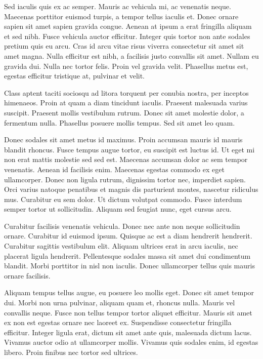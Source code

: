 Sed iaculis quis ex ac semper. Mauris ac vehicula mi, ac venenatis neque. Maecenas porttitor euismod turpis, a tempor tellus iaculis et. Donec ornare sapien sit amet sapien gravida congue. Aenean at ipsum a erat fringilla aliquam et sed nibh. Fusce vehicula auctor efficitur. Integer quis tortor non ante sodales pretium quis eu arcu. Cras id arcu vitae risus viverra consectetur sit amet sit amet magna. Nulla efficitur est nibh, a facilisis justo convallis sit amet. Nullam eu gravida dui. Nulla nec tortor felis. Proin vel gravida velit. Phasellus metus est, egestas efficitur tristique at, pulvinar et velit.

Class aptent taciti sociosqu ad litora torquent per conubia nostra, per inceptos himenaeos. Proin at quam a diam tincidunt iaculis. Praesent malesuada varius suscipit. Praesent mollis vestibulum rutrum. Donec sit amet molestie dolor, a fermentum nulla. Phasellus posuere mollis tempus. Sed sit amet leo quam.

Donec sodales sit amet metus id maximus. Proin accumsan mauris id mauris blandit rhoncus. Fusce tempus augue tortor, eu suscipit est luctus id. Ut eget mi non erat mattis molestie sed sed est. Maecenas accumsan dolor ac sem tempor venenatis. Aenean id facilisis enim. Maecenas egestas commodo ex eget ullamcorper. Donec non ligula rutrum, dignissim tortor nec, imperdiet sapien. Orci varius natoque penatibus et magnis dis parturient montes, nascetur ridiculus mus. Curabitur eu sem dolor. Ut dictum volutpat commodo. Fusce interdum semper tortor ut sollicitudin. Aliquam sed feugiat nunc, eget cursus arcu.

Curabitur facilisis venenatis vehicula. Donec nec ante non neque sollicitudin ornare. Curabitur id euismod ipsum. Quisque ac est a diam hendrerit hendrerit. Curabitur sagittis vestibulum elit. Aliquam ultrices erat in arcu iaculis, nec placerat ligula hendrerit. Pellentesque sodales massa sit amet dui condimentum blandit. Morbi porttitor in nisl non iaculis. Donec ullamcorper tellus quis mauris ornare facilisis.

Aliquam tempus tellus augue, eu posuere leo mollis eget. Donec sit amet tempor dui. Morbi non urna pulvinar, aliquam quam et, rhoncus nulla. Mauris vel convallis neque. Fusce non tellus tempor tortor aliquet efficitur. Mauris sit amet ex non est egestas ornare nec laoreet ex. Suspendisse consectetur fringilla efficitur. Integer ligula erat, dictum sit amet ante quis, malesuada dictum lacus. Vivamus auctor odio at ullamcorper mollis. Vivamus quis sodales enim, id egestas libero. Proin finibus nec tortor sed ultrices.

